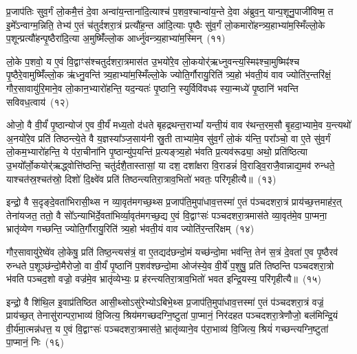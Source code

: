 प्र॒जा\-प॑तिः सुव॒र्गं लो॒कमै॒त्तं दे॒वा अन्वा॑य॒न्ताना॑दि॒त्याश्च॑ प॒शव॒श्चान्वा॑य॒न्ते दे॒वा अ॑ब्रुव॒न्॒ यान्प॒शूनु॒पाजी॑विष्म॒ त इ॒मे᳚\-ऽन्वाग्म॒न्निति॒ तेभ्य॑ ए॒तं च॑तुर्दशरा॒त्रं प्रत्यौ॑ह॒न्त आ॑दि॒त्याः पृ॒ष्ठैः सु॑व॒र्गं लो॒कमारो॑हन्त्र्य॒हाभ्या॑म॒स्मिँल्लो॒के प॒शून्प्रत्यौ॑हन्पृ॒ष्ठैरा॑दि॒त्या अ॒मुष्मिँ॑ल्लो॒क आर्ध्नु॑वन्त्र्य॒हाभ्या॑म॒स्मिन्~(११)

लो॒के प॒शवो॒ य ए॒वं वि॒द्वाꣳस॑श्चतुर्दशरा॒त्रमास॑त उ॒भयो॑रे॒व लो॒कयोर्॑ऋध्नुवन्त्य॒स्मिꣴश्चा॒मुष्मिꣴ॑श्च पृ॒ष्ठैरे॒वामुष्मिँ॑ल्लो॒क ऋ॑ध्नु॒वन्ति॑ त्र्य॒हाभ्या॑म॒स्मिँल्लो॒के ज्योति॒र्गौरायु॒रिति॑ त्र्य॒हो भ॑वती॒यं वाव ज्योति॑र॒न्तरि॑क्षं॒ गौर॒सावायु॑रि॒माने॒व लो॒कान॒भ्यारो॑हन्ति॒ यद॒न्यतः॑ पृ॒ष्ठानि॒ स्युर्विवि॑वधꣴ स्या॒न्मध्ये॑ पृ॒ष्ठानि॑ भवन्ति सविवध॒त्वाय॑~(१२)

ओजो॒ वै वी॒र्यं॑ पृ॒ष्ठान्योज॑ ए॒व वी॒र्यं॑ मध्य॒तो द॑धते बृहद्रथन्त॒रा\-भ्यां᳚ यन्ती॒यं वाव र॑थन्त॒रम॒सौ बृ॒हदा॒भ्यामे॒व य॒न्त्यथो॑ अ॒नयो॑रे॒व प्रति॑ तिष्ठन्त्ये॒ते वै य॒ज्ञस्या᳚ञ्ज॒साय॑नी स्रु॒ती ताभ्या॑मे॒व सु॑व॒र्गं लो॒कं य॑न्ति॒ परा᳚ञ्चो॒ वा ए॒ते सु॑व॒र्गं लो॒कम॒भ्यारो॑हन्ति॒ ये प॑रा॒चीना॑नि पृ॒ष्ठान्यु॑प॒यन्ति॑ प्र॒त्यङ्त्र्य॒हो भ॑वति प्र॒त्यव॑रूढ्या॒ अथो॒ प्रति॑ष्ठित्या उ॒भयो᳚र्लो॒कयोर्॑\mbox{}॑ऋद्ध्वोत्ति॑ष्ठन्ति॒ चतु॑र्दशै॒तास्तासां॒ या दश॒ दशा᳚क्षरा वि॒राडन्नं॑ वि॒राड्वि॒राजै॒वान्नाद्य॒मव॑ रुन्धते॒ याश्चत॑स्र॒श्चत॑स्रो॒ दिशो॑ दि॒क्ष्वे॑व प्रति॑ तिष्ठन्त्यतिरा॒त्राव॒भितो॑ भवतः॒ परि॑गृहीत्यै॥~(१३)

{\anuvakamend[{आर्ध्नु॑वन्त्र्य॒हाभ्या॑म॒स्मिन्थ्स॑विवध॒त्वाय॒ प्रति॑ष्ठित्या॒ एक॑त्रिꣳशच्च}]}%

इन्द्रो॒ वै स॒दृङ्दे॒वता॑भिरासी॒थ्स न व्या॒वृत॑मगच्छ॒थ्स प्र॒जा\-प॑ति॒मुपा॑धाव॒त्तस्मा॑ ए॒तं प॑ञ्चदशरा॒त्रं प्राय॑च्छ॒त्तमाह॑र॒त् तेना॑यजत॒ ततो॒ वै सो᳚\-ऽन्याभि॑र्दे॒वता॑भिर्व्या॒वृत॑मगच्छ॒द्य ए॒वं वि॒द्वाꣳसः॑ पञ्चदशरा॒त्रमास॑ते व्या॒वृत॑मे॒व पा॒प्मना॒ भ्रातृ॑व्येण गच्छन्ति॒ ज्योति॒र्गौरायु॒रिति॑ त्र्य॒हो भ॑वती॒यं वाव ज्योति॑र॒न्तरि॑क्षम्~(१४)

गौर॒सावायु॑रे॒ष्वे॑व लो॒केषु॒ प्रति॑ तिष्ठ॒न्त्यस॑त्रं॒ वा ए॒तद्यद॑छन्दो॒मं यच्छ॑न्दो॒मा भव॑न्ति॒ तेन॑ स॒त्रं दे॒वता॑ ए॒व पृ॒ष्ठैरव॑ रुन्धते प॒शूञ्छ॑न्दो॒मैरोजो॒ वा वी॒र्यं॑ पृ॒ष्ठानि॑ प॒शव॑श्छन्दो॒मा ओज॑स्ये॒व वी॒र्ये॑ प॒शुषु॒ प्रति॑ तिष्ठन्ति पञ्चदशरा॒त्रो भ॑वति पञ्चद॒शो वज्रो॒ वज्र॑मे॒व भ्रातृ॑व्येभ्यः॒ प्र ह॑रन्त्यतिरा॒त्राव॒भितो॑ भवत इन्द्रि॒यस्य॒ परि॑गृहीत्यै॥~(१५)

{\anuvakamend[{अ॒न्तरि॑क्षमिन्द्रि॒यस्यैक॑ञ्च}]}%

इन्द्रो॒ वै शि॑थि॒ल इ॒वाप्र॑तिष्ठित आसी॒थ्सो\-ऽसु॑रेभ्यो\-ऽबिभे॒थ्स प्र॒जा\-प॑ति॒मुपा॑धाव॒त्तस्मा॑ ए॒तं प॑ञ्चदशरा॒त्रं वज्रं॒ प्राय॑च्छ॒त् तेनासु॑रान्परा॒भाव्य॑ वि॒जित्य॒ श्रिय॑मगच्छदग्नि॒ष्टुता॑ पा॒प्मानं॒ निर॑दहत पञ्चदशरा॒त्रेणौजो॒ बल॑मिन्द्रि॒यं वी॒र्य॑मा॒त्मन्न॑धत्त॒ य ए॒वं वि॒द्वाꣳसः॑ पञ्चदशरा॒त्रमास॑ते॒ भ्रातृ॑व्याने॒व प॑रा॒भाव्य॑ वि॒जित्य॒ श्रियं॑ गच्छन्त्यग्नि॒ष्टुता॑ पा॒प्मानं॒ निः~(१६)

